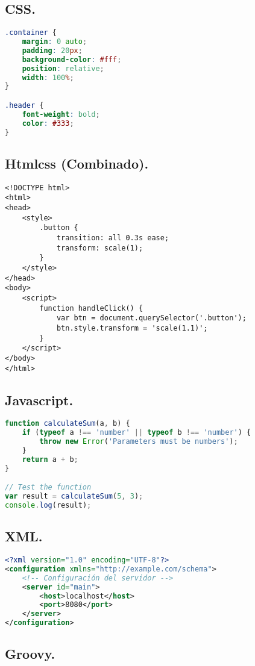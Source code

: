 \subsection{CSS.}

	\begin{lstlisting}[language=CSS]
.container {
	margin: 0 auto;
	padding: 20px;
	background-color: #fff;
	position: relative;
	width: 100%;
}

.header {
	font-weight: bold;
	color: #333;
}
	\end{lstlisting}
	
\subsection{Htmlcss (Combinado).}

	\begin{lstlisting}[style=htmlcssjs]
<!DOCTYPE html>
<html>
<head>
	<style>
		.button {
			transition: all 0.3s ease;
			transform: scale(1);
		}
	</style>
</head>
<body>
	<script>
		function handleClick() {
			var btn = document.querySelector('.button');
			btn.style.transform = 'scale(1.1)';
		}
	</script>
</body>
</html>
	\end{lstlisting}

\subsection{Javascript.}

	\begin{lstlisting}[language=JavaScript]
function calculateSum(a, b) {
	if (typeof a !== 'number' || typeof b !== 'number') {
		throw new Error('Parameters must be numbers');
	}
	return a + b;
}

// Test the function
var result = calculateSum(5, 3);
console.log(result);
	\end{lstlisting}

\subsection{XML.}

	\begin{lstlisting}[language=XML, extendedchars=true]
<?xml version="1.0" encoding="UTF-8"?>
<configuration xmlns="http://example.com/schema">
	<!-- Configuración del servidor -->
	<server id="main">
		<host>localhost</host>
		<port>8080</port>
	</server>
</configuration>
	\end{lstlisting}

\subsection{Groovy.}


